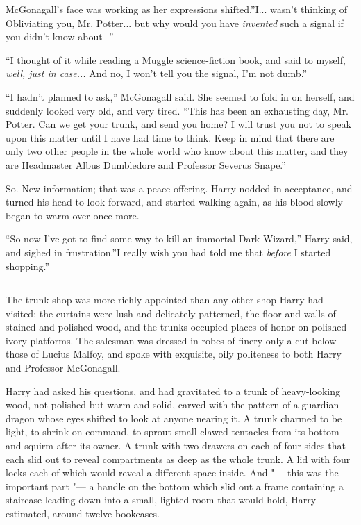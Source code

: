 McGonagall's face was working as her expressions shifted.''I...
wasn't thinking of Obliviating you, Mr. Potter... but why would you
have \emph{invented} such a signal if you didn't know about -''

``I thought of it while reading a Muggle science-fiction book, and said
to myself, \emph{well, just in case...} And no, I won't tell you
the signal, I'm not dumb.''

``I hadn't planned to ask,'' McGonagall said. She seemed to fold in on
herself, and suddenly looked very old, and very tired. ``This has been
an exhausting day, Mr. Potter. Can we get your trunk, and send you home?
I will trust you not to speak upon this matter until I have had time to
think. Keep in mind that there are only two other people in the whole
world who know about this matter, and they are Headmaster Albus
Dumbledore and Professor Severus Snape.''

So. New information; that was a peace offering. Harry nodded in
acceptance, and turned his head to look forward, and started walking
again, as his blood slowly began to warm over once more.

``So now I've got to find some way to kill an immortal Dark Wizard,''
Harry said, and sighed in frustration.''I really wish you had told me
that \emph{before} I started shopping.''

\begin{center}\rule{3in}{0.4pt}\end{center}

The trunk shop was more richly appointed than any other shop Harry had
visited; the curtains were lush and delicately patterned, the floor and
walls of stained and polished wood, and the trunks occupied places of
honor on polished ivory platforms. The salesman was dressed in robes of
finery only a cut below those of Lucius Malfoy, and spoke with
exquisite, oily politeness to both Harry and Professor McGonagall.

Harry had asked his questions, and had gravitated to a trunk of
heavy-looking wood, not polished but warm and solid, carved with the
pattern of a guardian dragon whose eyes shifted to look at anyone
nearing it. A trunk charmed to be light, to shrink on command, to sprout
small clawed tentacles from its bottom and squirm after its owner. A
trunk with two drawers on each of four sides that each slid out to
reveal compartments as deep as the whole trunk. A lid with four locks
each of which would reveal a different space inside. And "--- this was the
important part "--- a handle on the bottom which slid out a frame
containing a staircase leading down into a small, lighted room that
would hold, Harry estimated, around twelve bookcases.

